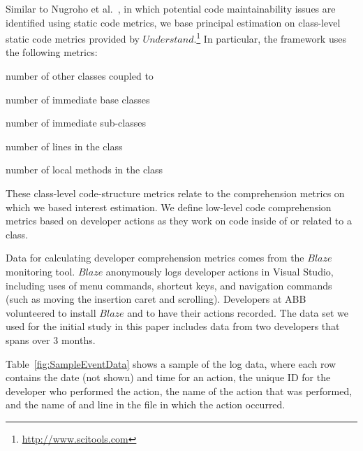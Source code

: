 

Similar to Nugroho et al.~\cite{Nugroho_etal:2011}, in which potential code maintainability issues are identified using static code metrics, we base principal estimation on class-level static code metrics provided by $Understand$.\footnote{\url{http://www.scitools.com}} In particular, the framework uses the following metrics:
\begin{description}[font=\itshape\mdseries,leftmargin=.42\linewidth,style=sameline]
    \item[Count~Class~Coupled] number of other classes coupled to
    \item[Count~Class~Base] number of immediate base classes
    \item[Count~Class~Derived] number of immediate sub-classes
    \item[Count~Line~Code] number of lines in the class
    \item[Count~Declared~Method] number of local methods in the class
\end{description}

These class-level code-structure metrics relate to the comprehension metrics on which we based interest estimation. We define low-level code comprehension metrics based on developer actions as they work on code inside of or related to a class.

Data for calculating developer comprehension metrics comes from the $Blaze$~\cite{Snipes_etal:2014} monitoring tool.  $Blaze$ anonymously logs developer actions in Visual Studio, including uses of menu commands, shortcut keys, and navigation commands (such as moving the insertion caret and scrolling).  Developers at ABB volunteered to install $Blaze$ and to have their actions recorded.  The data set we used for the initial study in this paper includes data from two developers that spans over 3 months.

Table~\ref{fig:SampleEventData} shows a sample of the log data, where each row contains the date (not shown) and time for an action, the unique ID for the developer who performed the action, the name of the action that was performed, and the name of and line in the file in which the action occurred.

